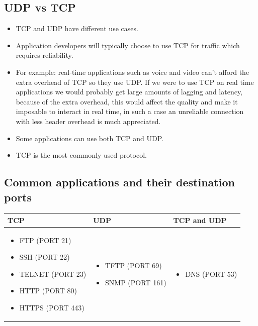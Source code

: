 \subsection{UDP vs TCP}
\begin{itemize}
    \item TCP and UDP have different use cases.
    \item Application developers will typically choose to use TCP for traffic which requires reliability.
    \item For example: real-time applications such as voice and video can't afford the extra overhead of TCP so they use UDP. If we were to use TCP on real time applications we would probably get large amounts of lagging and latency, because of the extra overhead, this would affect the quality and make it imposable to interact in real time, in such a case an unreliable connection with less header overhead is much appreciated.
    \item Some applications can use both TCP and UDP.
    \item TCP is the most commonly used protocol.
\end{itemize}

\subsection{Common applications and their destination ports}
\begin{center}
    \begin{tabular}{ |p{5cm}|p{5cm}|p{5cm}| }
        \hline
            TCP & UDP & TCP and UDP \\
        \hline
            {
                \begin{itemize}
                    \item FTP (PORT 21)
                    \item SSH (PORT 22)
                    \item TELNET (PORT 23)
                    \item HTTP (PORT 80)
                    \item HTTPS (PORT 443)
                \end{itemize}
            }
             &
            {
                \begin{itemize}
                    \item TFTP (PORT 69)
                    \item SNMP (PORT 161)
                \end{itemize} 
            }
            & 
            {
                \begin{itemize}
                    \item DNS (PORT 53)
                \end{itemize} 
            } 
            \\
        \hline
    \end{tabular}
\end{center}

